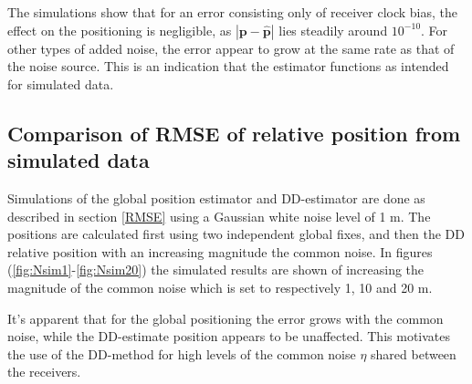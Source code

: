 \par
The simulations show that for an error consisting only of receiver clock bias, the effect on the positioning is negligible, as $|\textbf{p}-\hat{\textbf{p}}|$ lies steadily around $10^{-10}$. For other types of added noise, the error appear to grow at the same rate as that of the noise source. This is an indication that the estimator functions as intended for simulated data.

\subsection{Comparison of RMSE of relative position from simulated data}\label{RMSEsim}
Simulations of the global position estimator and DD-estimator are done as described in section \ref{RMSE} using a Gaussian white noise level of 1 m. The positions are calculated first using two independent global fixes, and then the DD relative position with an increasing magnitude the common noise. In figures (\ref{fig:Nsim1}-\ref{fig:Nsim20}) the simulated results are shown of increasing the magnitude of the common noise which is set to respectively 1, 10 and 20 m. 
\par
It's apparent that for the global positioning the error grows with the common noise, while the DD-estimate position appears to be unaffected. This motivates the use of the DD-method for high levels of the common noise $\eta$ shared between the receivers.
